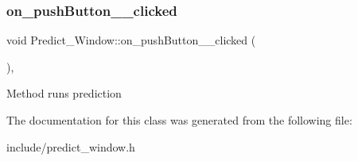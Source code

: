 \subsubsection{\texorpdfstring{on\+\_\+push\+Button\+\_\+\_\+clicked}{on\_pushButton\_2\_clicked}}
{\footnotesize\ttfamily void Predict\+\_\+\+Window\+::on\+\_\+push\+Button\+\_\+\_\+clicked (\begin{DoxyParamCaption}{ }\end{DoxyParamCaption})\hspace{0.3cm}{\ttfamily [private]}, {\ttfamily [slot]}}

Method runs prediction 

The documentation for this class was generated from the following file\+:\begin{DoxyCompactItemize}
\item 
include/predict\+\_\+window.\+h\end{DoxyCompactItemize}
